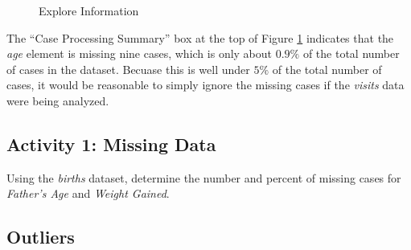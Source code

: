 \begin{figure}[H]
  \begin{center}
    \caption{Explore Information}
    \label{lab05_fig04}
  \end{center}
\end{figure}

The ``Case Processing Summary'' box at the top of Figure \ref{lab05_fig04} indicates that the \textit{age} element is missing nine cases, which is only about $ 0.9\% $ of the total number of cases in the dataset. Becuase this is well under $ 5\% $ of the total number of cases, it would be reasonable to simply ignore the missing cases if the \textit{visits} data were being analyzed.

\subsection{Activity 1: Missing Data} \label{lab05_act01}

Using the \textit{births} dataset, determine the number and percent of missing cases for \textit{Father's Age} and \textit{Weight Gained}.

\subsection{Outliers}


